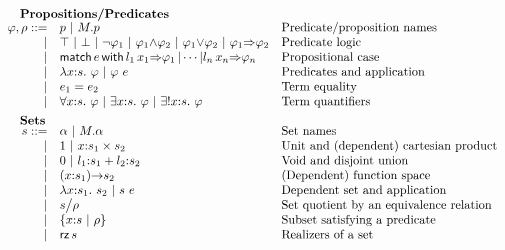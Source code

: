 \begin{figure}
	\[
	\begin{array}{rl@{\quad}l}
		\noalign{\textbf{Propositions/Predicates}}
		\ip,\ipp ::= 
		    & \iP \ibar \iselect{\im}{\iP}&\mbox{Predicate/proposition names}\\
		  | & \itrue \ | \ \ifalse \ibar \inot{\ip_1} \ibar {\ip_1}{\land}{\ip_2} \ibar 
		       {\ip_1}{\lor}{\ip_2}\ | \ {\ip_1}{\Rightarrow}{\ip_2} & \mbox{Predicate logic}\\
                  | & \ipcases{\ie}{\il_1}{\ix_1}{\ip_1}{\il_n}{\ix_n}{\ip_n} & \mbox{Propositional case}\\
		  | & \ilambda{\ix}{\is}{\ip}  \ibar \iapp{\ip}{\ie} & \mbox{Predicates and application}\\
		  | & \iequal{\ie_1}{\ie_2} & \mbox{Term equality}\\
		  | & \iforall{\ix}{\is}{\ip}  \ibar 
		      \iexists{\ix}{\is}{\ip} \ |\
		      \iunique{\ix}{\is}{\ip} & \mbox{Term quantifiers}\\[5pt]
		
		\noalign{\textbf{Sets}}
		\is ::= 
		    & \iS  \ibar \iselect{\im}{\iS} &\mbox{Set names}\\
		  | & \isunit \ibar \iprod{\ix}{\is_1}{\is_2}
                  &\mbox{Unit and (dependent) cartesian product}\\
		  | & \isvoid \ibar \isum{\il_1}{\is_1}{\il_2}{\is_2} &\mbox{Void and disjoint union}\\
		  | & \idarrow{\ix}{\is_1}{\is_2} & \mbox{(Dependent) function space} \\
		  | & \ilambda{\ix}{\is_1}{\is_2} \ibar 
		      \iapp{\is}{\ie} &\mbox{Dependent set and application}\\
		  | & \iquot{\is}{\ipp} & \mbox{Set quotient by an equivalence relation}\\
		  | & \isubset{\ix}{\is}{\ipp} & \mbox{Subset satisfying a predicate}\\
		  | & \irz{\is}&\mbox{Realizers of a set}\\[5pt] 
		

\end{array}\]
\end{figure}
